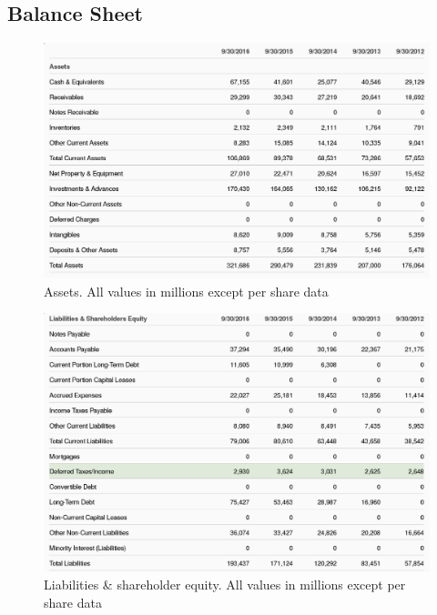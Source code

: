 \documentclass[12pt,a4paper,titlepage]{article}
\begin{document}
\subsection{Balance Sheet}
\begin{figure}[!htb]
  \centering
  \includegraphics[width=1\textwidth]{assets}
    \caption{Assets. All values in millions except per share data~\cite{zacks-bal}}
\end{figure}

\begin{figure}[!htb]
  \centering
  \includegraphics[width=.9\textwidth]{liabilities}
    \caption{Liabilities \& shareholder equity. All values in millions except
      per share data~\cite{zacks-bal}}
\end{figure}

\end{document}
